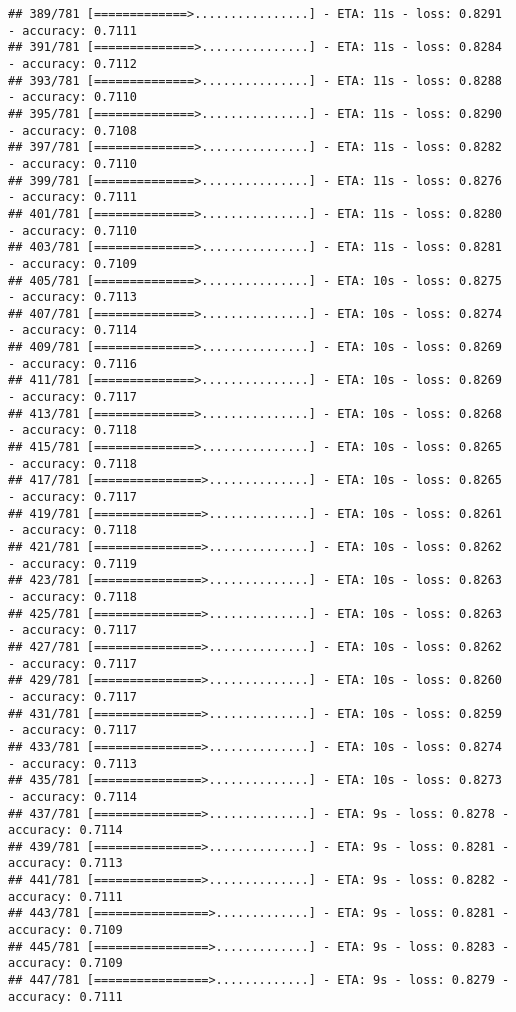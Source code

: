 \documentclass[
]{article}
\begin{document}
\begin{verbatim}
## 389/781 [=============>................] - ETA: 11s - loss: 0.8291 - accuracy: 0.7111
## 391/781 [==============>...............] - ETA: 11s - loss: 0.8284 - accuracy: 0.7112
## 393/781 [==============>...............] - ETA: 11s - loss: 0.8288 - accuracy: 0.7110
## 395/781 [==============>...............] - ETA: 11s - loss: 0.8290 - accuracy: 0.7108
## 397/781 [==============>...............] - ETA: 11s - loss: 0.8282 - accuracy: 0.7110
## 399/781 [==============>...............] - ETA: 11s - loss: 0.8276 - accuracy: 0.7111
## 401/781 [==============>...............] - ETA: 11s - loss: 0.8280 - accuracy: 0.7110
## 403/781 [==============>...............] - ETA: 11s - loss: 0.8281 - accuracy: 0.7109
## 405/781 [==============>...............] - ETA: 10s - loss: 0.8275 - accuracy: 0.7113
## 407/781 [==============>...............] - ETA: 10s - loss: 0.8274 - accuracy: 0.7114
## 409/781 [==============>...............] - ETA: 10s - loss: 0.8269 - accuracy: 0.7116
## 411/781 [==============>...............] - ETA: 10s - loss: 0.8269 - accuracy: 0.7117
## 413/781 [==============>...............] - ETA: 10s - loss: 0.8268 - accuracy: 0.7118
## 415/781 [==============>...............] - ETA: 10s - loss: 0.8265 - accuracy: 0.7118
## 417/781 [===============>..............] - ETA: 10s - loss: 0.8265 - accuracy: 0.7117
## 419/781 [===============>..............] - ETA: 10s - loss: 0.8261 - accuracy: 0.7118
## 421/781 [===============>..............] - ETA: 10s - loss: 0.8262 - accuracy: 0.7119
## 423/781 [===============>..............] - ETA: 10s - loss: 0.8263 - accuracy: 0.7118
## 425/781 [===============>..............] - ETA: 10s - loss: 0.8263 - accuracy: 0.7117
## 427/781 [===============>..............] - ETA: 10s - loss: 0.8262 - accuracy: 0.7117
## 429/781 [===============>..............] - ETA: 10s - loss: 0.8260 - accuracy: 0.7117
## 431/781 [===============>..............] - ETA: 10s - loss: 0.8259 - accuracy: 0.7117
## 433/781 [===============>..............] - ETA: 10s - loss: 0.8274 - accuracy: 0.7113
## 435/781 [===============>..............] - ETA: 10s - loss: 0.8273 - accuracy: 0.7114
## 437/781 [===============>..............] - ETA: 9s - loss: 0.8278 - accuracy: 0.7114 
## 439/781 [===============>..............] - ETA: 9s - loss: 0.8281 - accuracy: 0.7113
## 441/781 [===============>..............] - ETA: 9s - loss: 0.8282 - accuracy: 0.7111
## 443/781 [================>.............] - ETA: 9s - loss: 0.8281 - accuracy: 0.7109
## 445/781 [================>.............] - ETA: 9s - loss: 0.8283 - accuracy: 0.7109
## 447/781 [================>.............] - ETA: 9s - loss: 0.8279 - accuracy: 0.7111

\end{verbatim}
\end{document}
